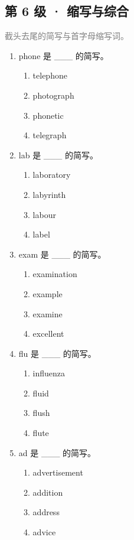 \documentclass[11pt,a4paper]{ctexart}
\begin{document}
\subsection*{第 6 级 · 缩写与综合}
\noindent\textcolor{gray}{截头去尾的简写与首字母缩写词。}\par\smallskip
\begin{enumerate}[leftmargin=*,itemsep=4pt]
\item phone 是 \_\_\_ 的简写。
\begin{enumerate}[label=\Alph*.,leftmargin=2em,itemsep=1pt,topsep=2pt]
\item telephone
\item photograph
\item phonetic
\item telegraph
\end{enumerate}
\item lab 是 \_\_\_ 的简写。
\begin{enumerate}[label=\Alph*.,leftmargin=2em,itemsep=1pt,topsep=2pt]
\item laboratory
\item labyrinth
\item labour
\item label
\end{enumerate}
\item exam 是 \_\_\_ 的简写。
\begin{enumerate}[label=\Alph*.,leftmargin=2em,itemsep=1pt,topsep=2pt]
\item examination
\item example
\item examine
\item excellent
\end{enumerate}
\item flu 是 \_\_\_ 的简写。
\begin{enumerate}[label=\Alph*.,leftmargin=2em,itemsep=1pt,topsep=2pt]
\item influenza
\item fluid
\item flush
\item flute
\end{enumerate}
\item ad 是 \_\_\_ 的简写。
\begin{enumerate}[label=\Alph*.,leftmargin=2em,itemsep=1pt,topsep=2pt]
\item advertisement
\item addition
\item address
\item advice

\end{enumerate}
\end{enumerate}
\end{document}
